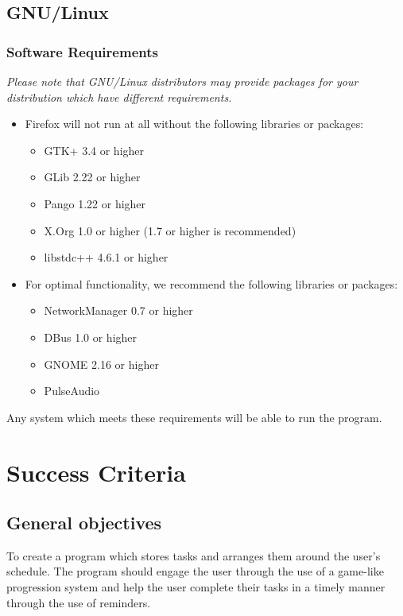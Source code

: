 \documentclass{article}
\begin{document}
\subsection*{GNU/Linux}\label{gnulinux}

\subsubsection*{Software Requirements}\label{software-requirements}

\emph{Please note that GNU/Linux distributors may provide packages for your
  distribution which have different requirements.}

\begin{itemize}
\item Firefox will not run at all without the following libraries or packages:

  \begin{itemize}
  \item GTK+ 3.4 or higher
  \item GLib 2.22 or higher
  \item Pango 1.22 or higher
  \item X.Org 1.0 or higher (1.7 or higher is recommended)
  \item libstdc++ 4.6.1 or higher
  \end{itemize}
\item For optimal functionality, we recommend the following libraries or
  packages:

  \begin{itemize}
  \item NetworkManager 0.7 or higher \index{\item}\index{\item}\item DBus 1.0 or
    higher
  \item GNOME 2.16 or higher
  \item PulseAudio
  \end{itemize}
\end{itemize}

Any system which meets these requirements will be able to run the program.

\section{Success Criteria}

\subsection{General objectives}
To create a program which stores tasks and arranges them around the user's
schedule. The program should engage the user through the use of a game-like
progression system and help the user complete their tasks in a timely manner
through the use of reminders.
\end{document}
